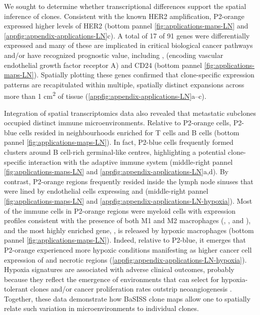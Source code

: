 We sought to determine whether transcriptional differences support the spatial inference of clones. Consistent with the known HER2 amplification, P2-orange expressed higher levels of HER2 (bottom pannel \cref{fig:applications-maps-LN} and \cref{appfig:appendix-applications-LN}c). A total of 17 of 91 genes were differentially expressed and many of these are implicated in critical biological cancer pathways and/or have recognized prognostic value, including ,  (encoding vascular endothelial growth factor receptor A) and CD24 \parencite{Sereesongsaeng2020-vp, Kwon2015-jk} (bottom pannel \cref{fig:applications-maps-LN}). Spatially plotting these genes confirmed that clone-specific expression patterns are recapitulated within multiple, spatially distinct expansions across more than 1 cm\textsuperscript{2} of tissue (\cref{appfig:appendix-applications-LN}a–c).

Integration of spatial transcriptomics data also revealed that metastatic subclones occupied distinct immune microenvironments. Relative to P2-orange cells, P2-blue cells resided in neighbourhoods enriched for T cells and B cells (bottom pannel \cref{fig:applications-maps-LN}). In fact, P2-blue cells frequently formed clusters around B cell-rich germinal-like centres, highlighting a potential clone-specific interaction with the adaptive immune system (middle-right pannel \cref{fig:applications-maps-LN} and \cref{appfig:appendix-applications-LN}a,d). By contrast, P2-orange regions frequently resided inside the lymph node sinuses that were lined by endothelial cells expressing  and  (middle-right pannel \cref{fig:applications-maps-LN} and \cref{appfig:appendix-applications-LN-hypoxia}). Most of the immune cells in P2-orange regions were myeloid cells with expression profiles consistent with the presence of both M1 and M2 macrophages (, ,  and ), and the most highly enriched gene, , is released by hypoxic macrophages \parencite{Li2015-ng} (bottom pannel \cref{fig:applications-maps-LN}). Indeed, relative to P2-blue, it emerges that P2-orange experienced more hypoxic conditions manifesting as higher cancer cell expression of  and necrotic regions (\cref{appfig:appendix-applications-LN-hypoxia}). Hypoxia signatures are associated with adverse clinical outcomes, probably because they reflect the emergence of environments that can select for hypoxia-tolerant clones and/or cancer proliferation rates outstrip neoangiogenesis \parencite{Cairns2004-vs}. Together, these data demonstrate how \ac{BaSISS} clone maps allow one to spatially relate such variation in microenvironments to individual clones.

